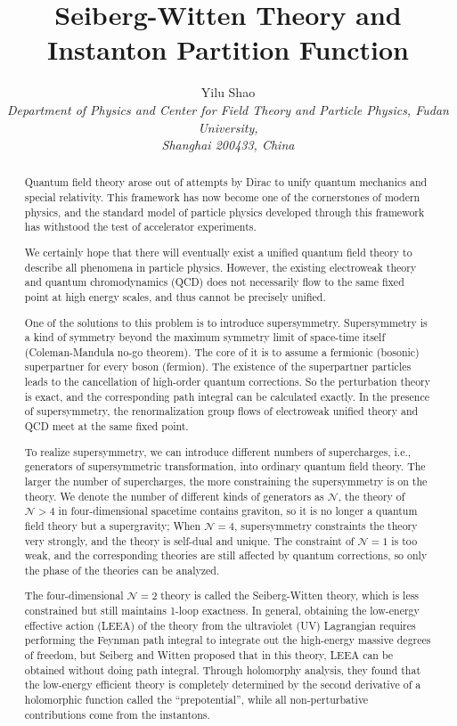 \documentclass{article}
\title{Seiberg-Witten Theory and Instanton Partition Function}
\author{Yilu Shao\\ \footnotesize{\it Department of Physics and Center for Field Theory and Particle Physics, Fudan University,}\\ \footnotesize{\it Shanghai 200433, China}}
\date{}
\begin{document}
\maketitle

\tableofcontents
\newpage

\begin{abstract}
Quantum field theory arose out of attempts by Dirac to unify quantum mechanics and special relativity. This framework has now become one of the cornerstones of modern physics, and the standard model of particle physics developed through this framework has withstood the test of accelerator experiments. 

We certainly hope that there will eventually exist a unified quantum field theory to describe all phenomena in particle physics. However, the existing electroweak theory and quantum chromodynamics (QCD) does not necessarily flow to the same fixed point at high energy scales, and thus cannot be precisely unified.

One of the solutions to this problem is to introduce supersymmetry. Supersymmetry is a kind of symmetry beyond the maximum symmetry limit of space-time itself (Coleman-Mandula no-go theorem). The core of it is to assume a fermionic (bosonic) superpartner for every boson (fermion). The existence of the superpartner particles leads to the cancellation of high-order quantum corrections. So the perturbation theory is exact, and the corresponding path integral can be calculated exactly. In the presence of supersymmetry, the renormalization group flows of electroweak unified theory and QCD meet at the same fixed point.

To realize supersymmetry, we can introduce different numbers of supercharges, i.e., generators of supersymmetric transformation, into ordinary quantum field theory. The larger the number of supercharges, the more constraining the supersymmetry is on the theory. We denote the number of different kinds of generators as $\mathcal{N}$, the theory of $\mathcal{N}>4$ in four-dimensional spacetime contains graviton, so it is no longer a quantum field theory but a supergravity; When $\mathcal{N}=4$, supersymmetry constraints the theory very strongly, and the theory is self-dual and unique. The constraint of $\mathcal{N}=1$ is too weak, and the corresponding theories are still affected by quantum corrections, so only the phase of the theories can be analyzed.

The four-dimensional $\mathcal{N}=2$ theory is called the Seiberg-Witten theory, which is less constrained but still maintains 1-loop exactness. In general, obtaining the low-energy effective action (LEEA) of the theory from the ultraviolet (UV) Lagrangian requires performing the Feynman path integral to integrate out the high-energy massive degrees of freedom, but Seiberg and Witten proposed that in this theory, LEEA can be obtained without doing path integral. Through holomorphy analysis, they found that the low-energy efficient theory is completely determined by the second derivative of a holomorphic function called the ``prepotential'', while all non-perturbative contributions come from the instantons.


\end{abstract}
\end{document}
